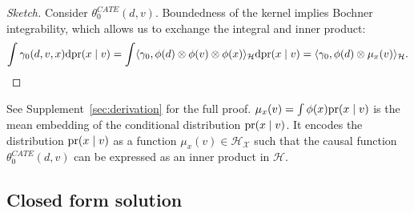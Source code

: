 \begin{proof}[Sketch] 
Consider $\theta_0^{CATE}(d,v)$. Boundedness of the kernel implies Bochner integrability, which allows us to exchange the integral and inner product:
\begin{align*}
    \int \gamma_0(d,v,x)\mathrm{d}\text{\normalfont pr}(x \mid v)=\int \langle \gamma_0, \phi(d)\otimes \phi(v)\otimes \phi(x)\rangle_{\mathcal{H}}  \mathrm{d}\text{\normalfont pr}(x \mid v) =\langle \gamma_0, \phi(d)\otimes \mu_x(v) \rangle_{\mathcal{H}}.
\end{align*}
\end{proof}
See Supplement~\ref{sec:derivation} for the full proof. $\mu_x(v)=\int\phi(x) \text{\normalfont pr}(x \mid v)$ is the mean embedding of the conditional distribution $\text{\normalfont pr}(x \mid v)$. It encodes the distribution $\text{\normalfont pr}(x \mid v)$ as a function $\mu_x(v)\in\mathcal{H}_{\mathcal{X}}$ such that the causal function $\theta_0^{CATE}(d,v)$ can be expressed as an inner product in $\mathcal{H}$.


\subsection{Closed form solution}

